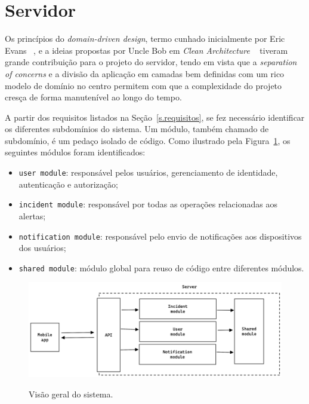 \FloatBarrier

\section{Servidor}

Os princípios do \emph{domain-driven design}, termo cunhado inicialmente por Eric Evans ~\cite{domain-driven-design}, e a ideias propostas por Uncle Bob em \emph{Clean Architecture} ~\cite{clean-architecture} tiveram grande contribuição para o projeto do servidor, tendo em vista que a \emph{separation of concerns} e a divisão da aplicação em camadas bem definidas com um rico modelo de domínio no centro permitem com que a complexidade do projeto cresça de forma manutenível ao longo do tempo.

A partir dos requisitos listados na Seção~\ref{s.requisitos}, se fez necessário identificar os diferentes subdomínios do sistema. Um módulo, também chamado de subdomínio, é um pedaço isolado de código. Como ilustrado pela Figura~\ref{f.system_server}, os seguintes módulos foram identificados:

\begin{itemize}
	\item \texttt{user module}: responsável pelos usuários, gerenciamento de identidade, autenticação e autorização;
	\item \texttt{incident module}: responsável por todas as operações relacionadas aos alertas;
	\item \texttt{notification module}: responsável pelo envio de notificações aos dispositivos dos usuários;
	\item \texttt{shared module}: módulo global para reuso de código entre diferentes módulos.
\end{itemize}

\begin{figure}[htbp]
	\caption{\small Visão geral do sistema.}
	\centering
	\includegraphics[width=\textwidth]{../diagrams/out/system_server.png}
	\label{f.system_server}
\end{figure}


